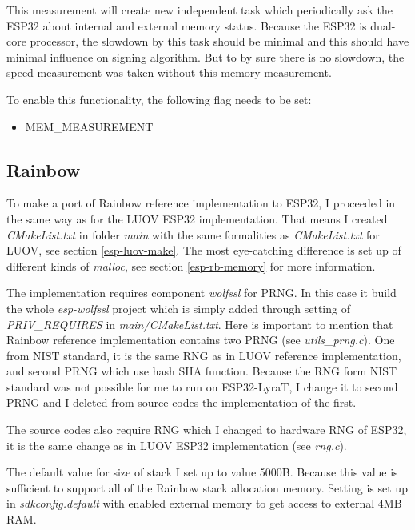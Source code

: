 \documentclass[thesis=M,english]{FITthesis}[2019/12/23]
\begin{document}
\bigskip
\noindent
This measurement will create new independent task which periodically ask the ESP32 about internal and external memory status. Because the ESP32 is dual-core processor, the slowdown by this task should be minimal and this should have minimal influence on signing algorithm. But to by sure there is no slowdown, the speed measurement was taken without this memory measurement.

\bigskip
\noindent
To enable this functionality, the following flag needs to be set:
\begin{itemize}
\item	MEM\_MEASUREMENT
\end{itemize}

\subsection{Rainbow}
To make a port of Rainbow reference implementation to ESP32, I proceeded in the same way as for the LUOV ESP32 implementation. That means I created \textit{CMakeList.txt} in folder \textit{main} with the same formalities as \textit{CMakeList.txt} for LUOV, see section \ref{esp-luov-make}. The most eye-catching difference is set up of different kinds of \textit{malloc}, see section \ref{esp-rb-memory} for more information.

\bigskip
\noindent
The implementation requires component \textit{wolfssl} for PRNG. In this case it build the whole \textit{esp-wolfssl} project which is simply added through setting of \textit{PRIV\_REQUIRES} in \textit{main/CMakeList.txt}. Here is important to mention that Rainbow reference implementation contains two PRNG (see \textit{utils\_prng.c}). One from NIST standard, it is the same RNG as in LUOV reference implementation, and second PRNG which use hash SHA function. Because the RNG form NIST standard was not possible for me to run on ESP32-LyraT, I change it to second PRNG and  I deleted from source codes the implementation of the first.

\bigskip
\noindent
The source codes also require RNG which I changed to hardware RNG of ESP32, it is the same change as in LUOV ESP32 implementation (see \textit{rng.c}).

\bigskip
\noindent
The default value for size of stack I set up to value 5000B. Because this value is sufficient to support all of the Rainbow stack allocation memory. Setting is set up in \textit{sdkconfig.default} with enabled external memory to get access to external 4MB RAM.
\end{document}
